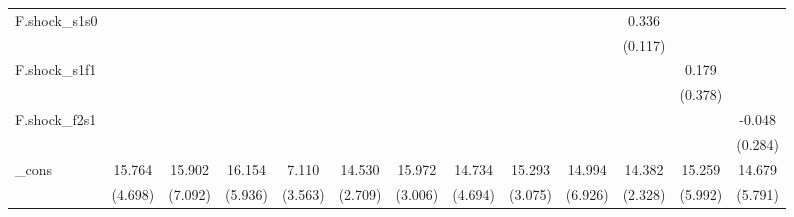 {\begin{tabular}{l*{12}{c}}
\addlinespace
F.shock\_s1s0&                     &                     &                     &                     &                     &                     &                     &                     &                     &       0.336\sym{**} &                     &                     \\
            &                     &                     &                     &                     &                     &                     &                     &                     &                     &     (0.117)         &                     &                     \\
\addlinespace
F.shock\_s1f1&                     &                     &                     &                     &                     &                     &                     &                     &                     &                     &       0.179         &                     \\
            &                     &                     &                     &                     &                     &                     &                     &                     &                     &                     &     (0.378)         &                     \\
\addlinespace
F.shock\_f2s1&                     &                     &                     &                     &                     &                     &                     &                     &                     &                     &                     &      -0.048         \\
            &                     &                     &                     &                     &                     &                     &                     &                     &                     &                     &                     &     (0.284)         \\
\addlinespace
\_cons      &      15.764\sym{***}&      15.902\sym{**} &      16.154\sym{**} &       7.110\sym{*}  &      14.530\sym{***}&      15.972\sym{***}&      14.734\sym{***}&      15.293\sym{***}&      14.994\sym{**} &      14.382\sym{***}&      15.259\sym{**} &      14.679\sym{**} \\
            &     (4.698)         &     (7.092)         &     (5.936)         &     (3.563)         &     (2.709)         &     (3.006)         &     (4.694)         &     (3.075)         &     (6.926)         &     (2.328)         &     (5.992)         &     (5.791)         \\

\end{tabular}}
